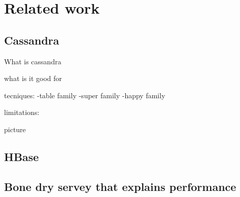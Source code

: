 \section{Related work}

\subsection{Cassandra}
What is cassandra

what is it good for

tecniques:
	-table family
	-super family
	-happy family

limitations:
	
picture



\subsection{HBase}

\subsection{Bone dry servey that explains performance}
